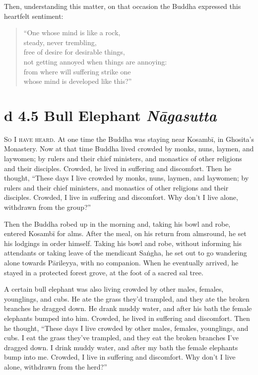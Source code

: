 \documentclass[12pt,openany]{book}%
\newcommand*{\suttatitleacronym}[1]{\smaller[2]{#1}\vspace*{.3em}}
\newcommand*{\suttatitletranslation}[1]{\linebreak{#1}}
\newcommand*{\suttatitleroot}[1]{\linebreak\smaller[2]\itshape{#1}}
\newcommand*{\tocacronym}[1]{\hspace*{-3.3em}{#1}\quad}
\newcommand*{\toctranslation}[1]{#1}
\newcommand*{\tocroot}[1]{(\textit{#1})}
\newcommand*{\scevam}[1]{\textsc{#1}}
\begin{document}
Then, understanding this matter, on that occasion the Buddha expressed this heartfelt sentiment: 

\begin{verse}%
“One whose mind is like a rock, \\
steady, never trembling, \\
free of desire for desirable things, \\
not getting annoyed when things are annoying: \\
from where will suffering strike one \\
whose mind is developed like this?” 

%
\end{verse}

%
\section*{{\suttatitleacronym Ud 4.5}{\suttatitletranslation A Bull Elephant }{\suttatitleroot Nāgasutta}}
\addcontentsline{toc}{section}{\tocacronym{Ud 4.5} \toctranslation{A Bull Elephant } \tocroot{Nāgasutta}}

\scevam{So I have heard. }At one time the Buddha was staying near \textsanskrit{Kosambī}, in Ghosita’s Monastery. Now at that time Buddha lived crowded by monks, nuns, laymen, and laywomen; by rulers and their chief ministers, and monastics of other religions and their disciples. Crowded, he lived in suffering and discomfort. Then he thought, “These days I live crowded by monks, nuns, laymen, and laywomen; by rulers and their chief ministers, and monastics of other religions and their disciples. Crowded, I live in suffering and discomfort. Why don’t I live alone, withdrawn from the group?” 

Then the Buddha robed up in the morning and, taking his bowl and robe, entered \textsanskrit{Kosambī} for alms. After the meal, on his return from almsround, he set his lodgings in order himself. Taking his bowl and robe, without informing his attendants or taking leave of the mendicant \textsanskrit{Saṅgha}, he set out to go wandering alone towards \textsanskrit{Pārileyya}, with no companion. When he eventually arrived, he stayed in a protected forest grove, at the foot of a sacred sal tree. 

A certain bull elephant was also living crowded by other males, females, younglings, and cubs. He ate the grass they’d trampled, and they ate the broken branches he dragged down. He drank muddy water, and after his bath the female elephants bumped into him. Crowded, he lived in suffering and discomfort. Then he thought, “These days I live crowded by other males, females, younglings, and cubs. I eat the grass they’ve trampled, and they eat the broken branches I’ve dragged down. I drink muddy water, and after my bath the female elephants bump into me. Crowded, I live in suffering and discomfort. Why don’t I live alone, withdrawn from the herd?” 
\end{document}
